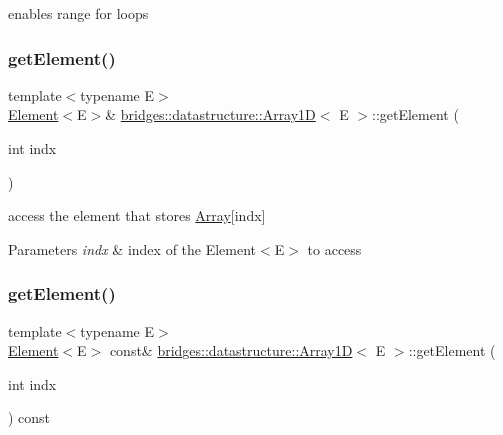enables range for loops 

\mbox{\label{classbridges_1_1datastructure_1_1_array1_d_a48fbe4ee71c52303033effcd4e1369c0}} 
\subsubsection{\texorpdfstring{getElement()}{getElement()}\hspace{0.1cm}{\footnotesize\ttfamily [1/2]}}
{\footnotesize\ttfamily template$<$typename E$>$ \\
\mbox{\hyperlink{classbridges_1_1datastructure_1_1_element}{Element}}$<$E$>$\& \mbox{\hyperlink{classbridges_1_1datastructure_1_1_array1_d}{bridges\+::datastructure\+::\+Array1D}}$<$ E $>$\+::get\+Element (\begin{DoxyParamCaption}\item[{int}]{indx }\end{DoxyParamCaption})\hspace{0.3cm}{\ttfamily [inline]}}



access the element that stores \mbox{\hyperlink{classbridges_1_1datastructure_1_1_array}{Array}}\mbox{[}indx\mbox{]} 


\begin{DoxyParams}{Parameters}
{\em indx} & index of the Element$<$\+E$>$ to access \\
\hline
\end{DoxyParams}
\mbox{\label{classbridges_1_1datastructure_1_1_array1_d_a92398a260b9d2a09d6f1f536a36a0988}} 
\subsubsection{\texorpdfstring{getElement()}{getElement()}\hspace{0.1cm}{\footnotesize\ttfamily [2/2]}}
{\footnotesize\ttfamily template$<$typename E$>$ \\
\mbox{\hyperlink{classbridges_1_1datastructure_1_1_element}{Element}}$<$E$>$ const\& \mbox{\hyperlink{classbridges_1_1datastructure_1_1_array1_d}{bridges\+::datastructure\+::\+Array1D}}$<$ E $>$\+::get\+Element (\begin{DoxyParamCaption}\item[{int}]{indx }\end{DoxyParamCaption}) const\hspace{0.3cm}{\ttfamily [inline]}}



